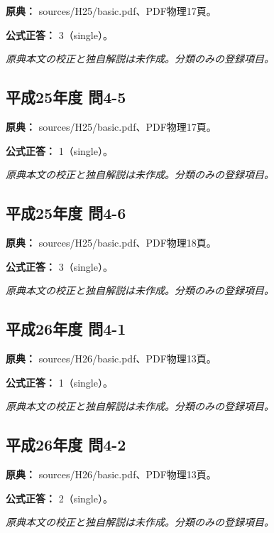 \noindent\textbf{原典：} sources/H25/basic.pdf、PDF物理17頁。

\textbf{公式正答：} 3（single）。

\par\textit{原典本文の校正と独自解説は未作成。分類のみの登録項目。}

\subsection{平成25年度 問4-5}
\label{q:h25-reg-basic-4-5}

\noindent\textbf{原典：} sources/H25/basic.pdf、PDF物理17頁。

\textbf{公式正答：} 1（single）。

\par\textit{原典本文の校正と独自解説は未作成。分類のみの登録項目。}

\subsection{平成25年度 問4-6}
\label{q:h25-reg-basic-4-6}

\noindent\textbf{原典：} sources/H25/basic.pdf、PDF物理18頁。

\textbf{公式正答：} 3（single）。

\par\textit{原典本文の校正と独自解説は未作成。分類のみの登録項目。}

\subsection{平成26年度 問4-1}
\label{q:h26-reg-basic-4-1}

\noindent\textbf{原典：} sources/H26/basic.pdf、PDF物理13頁。

\textbf{公式正答：} 1（single）。

\par\textit{原典本文の校正と独自解説は未作成。分類のみの登録項目。}

\subsection{平成26年度 問4-2}
\label{q:h26-reg-basic-4-2}

\noindent\textbf{原典：} sources/H26/basic.pdf、PDF物理13頁。

\textbf{公式正答：} 2（single）。

\par\textit{原典本文の校正と独自解説は未作成。分類のみの登録項目。}

